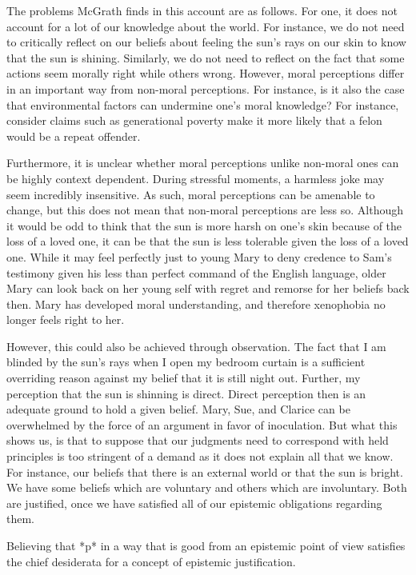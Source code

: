 \documentclass[12pt]{book}
\theoremstyle{definition}
\theoremstyle{remark}
\newcommand{\NormalTok}[1]{#1}
\newenvironment{Shaded}{}{}
\newenvironment{Highlighting}{}{}
\begin{document}
The problems McGrath finds in this account are as follows. For one, it does not account for a lot of our knowledge about the world. For instance, we do not need to critically reflect on our beliefs about feeling the sun's rays on our skin to know that the sun is shining. Similarly, we do not need to reflect on the fact that some actions seem morally right while others wrong. However, moral perceptions differ in an important way from non-moral perceptions. For instance, is it also the case that environmental factors can undermine one's moral knowledge? For instance, consider claims such as generational poverty make it more likely that a felon would be a repeat offender.

Furthermore, it is unclear whether moral perceptions unlike non-moral ones can be highly context dependent. During stressful moments, a harmless joke may seem incredibly insensitive. As such, moral perceptions can be amenable to change, but this does not mean that non-moral perceptions are less so. Although it would be odd to think that the sun is more harsh on one's skin because of the loss of a loved one, it can be that the sun is less tolerable given the loss of a loved one. While it may feel perfectly just to young Mary to deny credence to Sam's testimony given his less than perfect command of the English language, older Mary can look back on her young self with regret and remorse for her beliefs back then. Mary has developed moral understanding, and therefore xenophobia no longer feels right to her.

However, this could also be achieved through observation. The fact that I am blinded by the sun's rays when I open my bedroom curtain is a sufficient overriding reason against my belief that it is still night out. Further, my perception that the sun is shinning is direct. Direct perception then is an adequate ground to hold a given belief. Mary, Sue, and Clarice can be overwhelmed by the force of an argument in favor of inoculation. But what this shows us, is that to suppose that our judgments need to correspond with held principles is too stringent of a demand as it does not explain all that we know. For instance, our beliefs that there is an external world or that the sun is bright. We have some beliefs which are voluntary and others which are involuntary. Both are justified, once we have satisfied all of our epistemic obligations regarding them.

\begin{Shaded}
\begin{Highlighting}[]

\NormalTok{Believing that *p* in a way that is good from an epistemic point of view satisfies the chief desiderata for a concept of epistemic justification.}
\end{Highlighting}
\end{Shaded}
\end{document}
